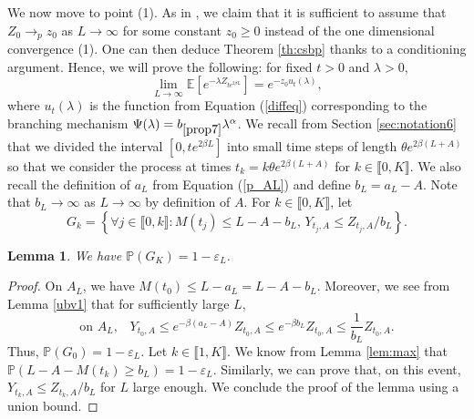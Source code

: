 \documentclass[11pt]{article}
\theoremstyle{plain}
\newtheorem{lemma}{Lemma}[section]
\newcommand\vep{\varepsilon}
\begin{document}
We now move to point (1). As in \cite{Maillard:2020aa}, we claim that 
 it is  sufficient to assume that $Z_0\rightarrow_pz_0$ as $L\rightarrow \infty$ for some constant $z_0\geq 0$ instead of the one dimensional convergence (1). One can then deduce Theorem \ref{th:csbp} thanks to a conditioning argument.
Hence, we will prove the following: for fixed $t>0$ and  $\lambda>0$, 
\begin{equation}
\underset{L\rightarrow \infty}{\lim}\mathbb{E}\left[e^{-\lambda Z_{te^{2\beta L}}}\right]=e^{-z_0u_t(\lambda)}, \label{eq:CV:CSBP}
\end{equation}
where $u_t(\lambda)$ is the function from Equation (\ref{diffeq}) corresponding to the branching mechanism $\Psi(\lambda)=b_{\ref{prop7}}\lambda^\alpha$.
We recall from Section \ref{sec:notation6} that we divided the interval $[0,te^{2\beta L}]$ into small time steps of length $\theta e^{2\beta(L+A)}$ so that we consider the process at times $t_k=k\theta e^{2\beta (L+A)}$ for  $k\in\llbracket 0,K\rrbracket$. 
We also recall  the definition of $a_L$ from Equation (\ref{p_AL}) and define $b_L=a_L-A$. Note that $b_L\to\infty$ as $L\to \infty$ by definition of $A$. For $k\in\llbracket 0,K\rrbracket$, let
\begin{equation}
G_k=\left\{\forall j\in\llbracket0,k\rrbracket:M(t_j)\leqslant L-A-b_L, \, Y_{t_j,A}\leqslant Z_{t_j,A}/b_L\right\}. \label{def:Gk}
\end{equation}

\begin{lemma}\label{lem:proba:G}
We have $\mathbb{P}(G_K)=1-\vep_L$. 
\end{lemma}
\begin{proof} On $A_L$, we have $M(t_0)\leqslant L-a_L= L-A-b_L$. Moreover, we see from Lemma \ref{ubv1} that for sufficiently large $L$,
\begin{equation*}
\text{on $A_L$,}\quad Y_{t_0,A}\leqslant  e^{-\beta(a_L-A)}Z_{t_0,A}\leqslant e^{-\beta b_L}Z_{t_0,A}\leqslant \frac{1}{b_L}Z_{t_0,A}.
\end{equation*}
Thus, $\mathbb{P}(G_0)=1-\vep_L$.  Let $k\in\llbracket 1,K\rrbracket$. We know from Lemma \ref{lem:max} that $\mathbb{P}\left(L-A-M(t_k)\geqslant b_L\right)=1-\vep_L$. Similarly, we can prove that, on this event,  $Y_{t_k,A}\leqslant Z_{t_k,A}/b_L$ for $L$ large enough. We conclude the proof of the lemma using a union bound.
\end{proof}
\end{document}
